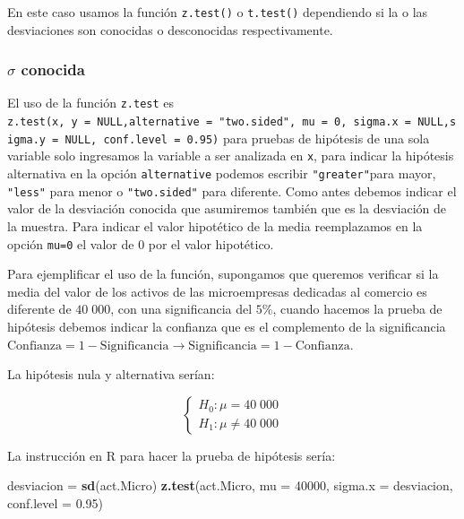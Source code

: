 \documentclass[letterpaper,]{book}
\newenvironment{Shaded}{\begin{snugshade}}{\end{snugshade}}
\newcommand{\DataTypeTok}[1]{\textcolor[rgb]{0.13,0.29,0.53}{#1}}
\newcommand{\DecValTok}[1]{\textcolor[rgb]{0.00,0.00,0.81}{#1}}
\newcommand{\FloatTok}[1]{\textcolor[rgb]{0.00,0.00,0.81}{#1}}
\newcommand{\KeywordTok}[1]{\textcolor[rgb]{0.13,0.29,0.53}{\textbf{#1}}}
\newcommand{\NormalTok}[1]{#1}
\newcommand{\StringTok}[1]{\textcolor[rgb]{0.31,0.60,0.02}{#1}}
\begin{document}
En este caso usamos la función \texttt{z.test()} o \texttt{t.test()} dependiendo si la o las desviaciones son conocidas o desconocidas respectivamente.

\hypertarget{sigma-conocida}{%
\subsubsection{\texorpdfstring{\(\sigma\) conocida}{\textbackslash{}sigma conocida}}\label{sigma-conocida}}

El uso de la función \texttt{z.test} es \texttt{z.test(x,\ y\ =\ NULL,alternative\ =\ "two.sided",\ mu\ =\ 0,\ sigma.x\ =\ NULL,sigma.y\ =\ NULL,\ conf.level\ =\ 0.95)} para pruebas de hipótesis de una sola variable solo ingresamos la variable a ser analizada en \texttt{x}, para indicar la hipótesis alternativa en la opción \texttt{alternative} podemos escribir \texttt{"greater"}para mayor, \texttt{"less"} para menor o \texttt{"two.sided"} para diferente. Como antes debemos indicar el valor de la desviación conocida que asumiremos también que es la desviación de la muestra.
Para indicar el valor hipotético de la media reemplazamos en la opción \texttt{mu=0} el valor de \(0\) por el valor hipotético.

Para ejemplificar el uso de la función, supongamos que queremos verificar si la media del valor de los activos de las microempresas dedicadas al comercio es diferente de \(40\;000\), con una significancia del \(5\%\), cuando hacemos la prueba de hipótesis debemos indicar la confianza que es el complemento de la significancia \(\text{Confianza}=1- \text{Significancia} \rightarrow \text{Significancia}=1-\text{Confianza}\).

La hipótesis nula y alternativa serían:

\begin{equation} 
\begin{cases} 
H_0: \mu = 40\;000 \\ 
H_1: \mu \neq 40\;000
\end{cases} 
\end{equation}

La instrucción en R para hacer la prueba de hipótesis sería:

\begin{Shaded}
\begin{Highlighting}[]
\NormalTok{desviacion =}\StringTok{ }\KeywordTok{sd}\NormalTok{(act.Micro)}
\KeywordTok{z.test}\NormalTok{(act.Micro, }\DataTypeTok{mu =} \DecValTok{40000}\NormalTok{, }\DataTypeTok{sigma.x =}\NormalTok{ desviacion, }\DataTypeTok{conf.level =} \FloatTok{0.95}\NormalTok{)}
\end{Highlighting}
\end{Shaded}
\end{document}
